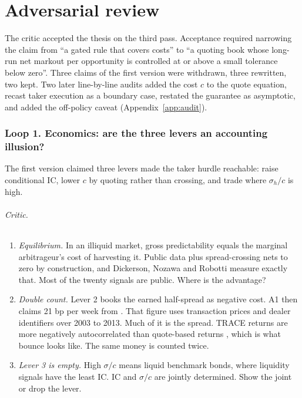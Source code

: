 \documentclass[11pt,letterpaper]{article}
\begin{document}
\part{Adversarial review}
\label{part:review}

The critic accepted the thesis on the third pass. Acceptance required narrowing the claim from ``a gated rule that covers costs'' to ``a quoting book whose long-run net markout per opportunity is controlled at or above a small tolerance below zero''. Three claims of the first version were withdrawn, three rewritten, two kept. Two later line-by-line audits added the cost $c$ to the quote equation, recast taker execution as a boundary case, restated the guarantee as asymptotic, and added the off-policy caveat (Appendix~\ref{app:audit}).

\section{Loop 1. Economics: are the three levers an accounting illusion?}

The first version claimed three levers made the taker hurdle reachable: raise conditional IC, lower $c$ by quoting rather than crossing, and trade where $\sigma_h/c$ is high.

\paragraph{Critic.}
\begin{enumerate}[itemsep=2pt,topsep=2pt]
\item \emph{Equilibrium.} In an illiquid market, gross predictability equals the marginal arbitrageur's cost of harvesting it. Public data plus spread-crossing nets to zero by construction, and Dickerson, Nozawa and Robotti \cite{dnr2024} measure exactly that. Most of the twenty signals are public. Where is the advantage?
\item \emph{Double count.} Lever 2 books the earned half-spread as negative cost. A1 then claims 21 bp per week from \cite{fn2024}. That figure uses transaction prices and dealer identifiers over 2003 to 2013. Much of it is the spread. TRACE returns are more negatively autocorrelated than quote-based returns \cite{andreani2024}, which is what bounce looks like. The same money is counted twice.
\item \emph{Lever 3 is empty.} High $\sigma/c$ means liquid benchmark bonds, where liquidity signals have the least IC. IC and $\sigma/c$ are jointly determined. Show the joint or drop the lever.
\end{enumerate}
\end{document}
